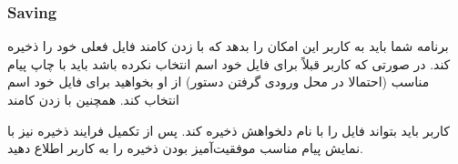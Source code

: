 \subsubsection*{{\titr Saving}}


برنامه شما باید به کاربر این امکان را بدهد که با زدن کامند 
فایل فعلی خود را ذخیره کند. در صورتی که کاربر قبلاً برای فایل خود اسم انتخاب نکرده باشد باید با چاپ پیام مناسب (احتمالا در محل ورودی گرفتن دستور) از او بخواهید برای فایل خود اسم انتخاب کند.
همچنین با زدن کامند


کاربر باید بتواند فایل را با نام دلخواهش ذخیره کند.
پس از تکمیل فرایند ذخیره نیز با نمایش پیام مناسب موفقیت‌آمیز بودن ذخیره را به کاربر اطلاع دهید.
